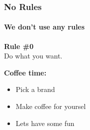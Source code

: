 
\begin{frame}%
  \frametitle{\hspace{4mm}No Rules}%
  \framesubtitle{\hspace{4mm}We don't use any rules}%
  \begin{mdframed}[style=HavasuLightBlueStyle]%
    \textbf{Rule \#0}\\%
    Do what you want.
  \end{mdframed}%
  \begin{mdframed}[style=HavasuLightGreenStyle]%
    \textbf{Coffee time:}%
    \begin{itemize}%
      \item Pick a brand%
      \item Make coffee for yoursel %
      \item Lets have some fun%
    \end{itemize}%
  \end{mdframed}%
\end{frame}%

